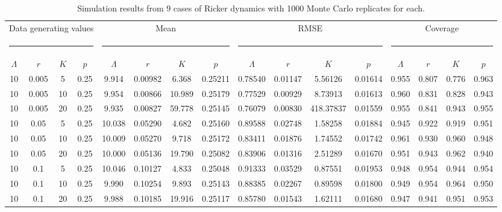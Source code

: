 \documentclass{article}
\begin{document}
\begin{table}
  \centering
  \footnotesize
  \caption{Simulation results from 9 cases of Ricker dynamics with 1000 Monte Carlo replicates for each.}
  \begin{tabular}{cccccccccccccccc}
    \hline
    \multicolumn{4}{c}{Data generating values}&
    \multicolumn{4}{c}{Mean} &
    \multicolumn{4}{c}{RMSE} &
    \multicolumn{4}{c}{Coverage} \\
    \multicolumn{4}{c}{\rule{4cm}{1pt}} &
    \multicolumn{4}{c}{\rule{4cm}{1pt}} &
    \multicolumn{4}{c}{\rule{4cm}{1pt}} &
    \multicolumn{4}{c}{\rule{4cm}{1pt}} \\
    $\Lambda$ & $r$ & $K$ & $p$ & $\Lambda$ & $r$ & $K$ & $p$ & $\Lambda$ & $r$ & $K$ &
    $p$ & $\Lambda$ & $r$ & $K$ & $p$ \\
    \hline
10	&0.005	&5	&0.25	&9.914 &0.00982  &6.368 &0.25211	&0.78540 &0.01147   &5.56126 &0.01614	&0.955 &0.807 &0.776 &0.963\\
10	&0.005	&10	&0.25	&9.954 &0.00866 &10.989 &0.25179 &0.77529 &0.00929   &8.73913 &0.01613  &0.960 &0.831 &0.828 &0.943\\
10	&0.005	&20	&0.25	&9.935 &0.00827 &59.778 &0.25145 &0.76079 &0.00830 &418.37837 &0.01559  &0.955 &0.841 &0.943 &0.955\\
10	&0.05	&5	&0.25	&10.038 &0.05290  &4.682 &0.25160 &0.89588 &0.02748   &1.58258 &0.01884  &0.945 &0.922 &0.919 &0.951\\
10	&0.05	&10	&0.25	&10.009 &0.05270  &9.718 &0.25172 &0.83411 &0.01876   &1.74552 &0.01742  &0.961 &0.930 &0.960 &0.948\\
10	&0.05	&20	&0.25	&10.000 &0.05136 &19.790 &0.25082 &0.83906 &0.01316   &2.51289 &0.01670  &0.951 &0.943 &0.962 &0.940\\
10	&0.1	&5	&0.25	&10.046 &0.10127  &4.833 &0.25048 &0.91333 &0.03529   &0.87551 &0.01953  &0.948 &0.954 &0.944 &0.954\\
10	&0.1	&10	&0.25	&9.990 &0.10254  &9.893 &0.25143 &0.88385 &0.02267   &0.89598 &0.01800  &0.949 &0.954 &0.964 &0.950\\
10	&0.1	&20	&0.25	&9.988 &0.10185 &19.916 &0.25117 &0.85780 &0.01543   &1.62111 &0.01680  &0.947 &0.941 &0.951 &0.953\\
  \hline
  \end{tabular}
  \label{tab:simricker}
\end{table}
\end{document}

